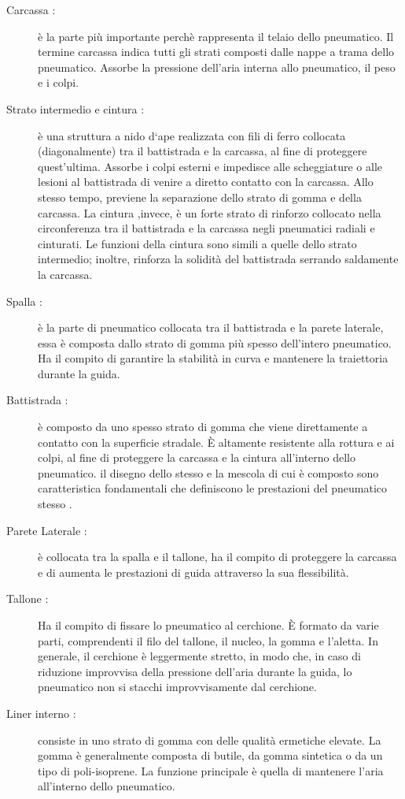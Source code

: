 \begin{description}
    \item[Carcassa :] è la parte più importante perchè rappresenta il telaio dello pneumatico. Il termine carcassa indica tutti gli strati composti dalle nappe a trama dello pneumatico. Assorbe la pressione dell'aria interna allo pneumatico, il peso e i colpi.
    \item [Strato intermedio e cintura :]
    è una struttura a nido d‘ape realizzata con fili di ferro collocata (diagonalmente) tra il battistrada e la carcassa, al fine di proteggere quest'ultima. Assorbe i colpi esterni e impedisce alle scheggiature o alle lesioni al battistrada di venire a diretto contatto con la carcassa. Allo stesso tempo, previene la separazione dello strato di gomma e della carcassa. La cintura ,invece, è un forte strato di rinforzo collocato nella circonferenza tra il battistrada e la carcassa negli pneumatici radiali e cinturati. Le funzioni della cintura sono simili a quelle dello strato intermedio; inoltre, rinforza la solidità del battistrada serrando saldamente la carcassa.
    \item [Spalla :] è la parte di pneumatico collocata tra il battistrada e la parete laterale, essa è composta dallo strato di gomma più spesso dell'intero pneumatico. Ha il compito di garantire la stabilità in curva e mantenere la traiettoria durante la guida.
    \item [Battistrada :] è composto da uno spesso strato di gomma che viene direttamente a contatto con la superficie stradale. È altamente resistente alla rottura e ai colpi, al fine di proteggere la carcassa e la cintura all'interno dello pneumatico. 
    il disegno dello stesso e la mescola di cui è composto sono caratteristica fondamentali che definiscono le prestazioni del pneumatico stesso .
    \item [Parete Laterale :] è collocata tra la spalla e il tallone, ha il compito di proteggere la carcassa e di aumenta le prestazioni di guida attraverso la sua flessibilità.
    \item [Tallone :] Ha il compito di fissare lo pneumatico al cerchione. È formato da varie parti, comprendenti il filo del tallone, il nucleo, la gomma e l'aletta. In generale, il cerchione è leggermente stretto, in modo che, in caso di riduzione improvvisa della pressione dell'aria durante la guida, lo pneumatico non si stacchi improvvisamente dal cerchione.
    \item [Liner interno :]
     consiste in uno strato di gomma con delle qualità ermetiche elevate. La gomma è generalmente composta di butile, da gomma sintetica o da un tipo di poli-isoprene. La funzione principale è quella di mantenere l'aria all'interno dello pneumatico.
\end{description}



